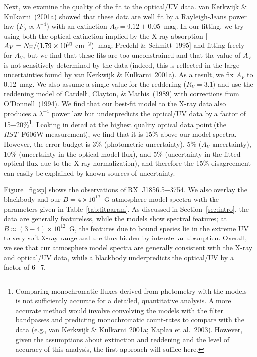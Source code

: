 \documentclass[useAMS,usegraphicx]{mn2e}
\newcommand{\etal}{et al.}
\newcommand{\rxjw}{RX~J1856.5$-$3754}
\newcommand{\nh}{\ensuremath{N_{\rm H}}}
\newcommand{\hst}{\textit{HST}}
\newcommand{\expnt}[2]{\ensuremath{#1 \times 10^{#2}}}   %
\begin{document}
Next, we examine the quality of the fit to the optical/UV data.  van
Kerkwijk \& Kulkarni~(2001a) showed that these data are well fit by a
Rayleigh-Jeans power law ($F_{\lambda} \propto \lambda^{-4}$) with an
extinction $A_{V}=0.12 \pm 0.05$~mag.  In our fitting, we try using
both the optical extinction implied by the X-ray absorption
[$A_{V}=\nh/(\expnt{1.79}{21}\mbox{ cm}^{-2})$~mag; Predehl \&
Schmitt~1995] and fitting freely for $A_V$, but we find that these
fits are too unconstrained and that the value of $A_V$ is not
sensitively determined by the data (indeed, this is reflected in the
large uncertainties found by van Kerkwijk \& Kulkarni~2001a).  As a
result, we fix $A_V$ to 0.12~mag.
We also assume a single value for the reddening ($R_{V}=3.1$) and use the
reddening model of Cardelli, Clayton, \& Mathis~(1989) with
corrections from O'Donnell~(1994).  We find that our best-fit model to
the X-ray data also produces a $\lambda^{-4}$ power law but
underpredicts the optical/UV data by a factor of 15$-$20\%\footnote{
Comparing monochromatic fluxes derived from
photometry with the models is not sufficiently accurate for a
detailed, quantitative analysis.  A more accurate method would involve
convolving the models with the filter bandpasses and predicting
monochromatic count-rates to compare with the data (e.g., van Kerkwijk
\& Kulkarni~2001a; Kaplan \etal~2003).  However, given the assumptions
about extinction and reddening and the level of accuracy of this
analysis, the first approach will suffice here.}.  Looking in detail
at the highest quality optical data point (the \hst\ F606W measurement),
we find that it is 15\% above our model spectra.  However, the error budget
is 3\% (photometric uncertainty), 5\% ($A_V$ uncertainty),
10\% (uncertainty in the optical model flux), and 5\% (uncertainty
in the fitted optical flux due to the X-ray normalization), and therefore
the 15\% disagreement can easily be explained by known sources of
uncertainty.

Figure~\ref{fig:sp} shows the observations of \rxjw.
We also overlay the blackbody and our $B=4\times 10^{12}$~G atmosphere
model spectra with the parameters given in Table~\ref{tab:fitparam}.
As discussed in Section~\ref{sec:intro}, the data are generally featureless,
while the models show spectral features;
at $B\approx (3-4)\times 10^{12}$~G, the features due to bound species
lie in the extreme UV to very soft X-ray range and are thus hidden by
interstellar absorption.
Overall, we see that our atmosphere model spectra are
generally consistent with the X-ray and optical/UV data, while a blackbody
underpredicts the optical/UV by a factor of 6$-$7.
\end{document}
